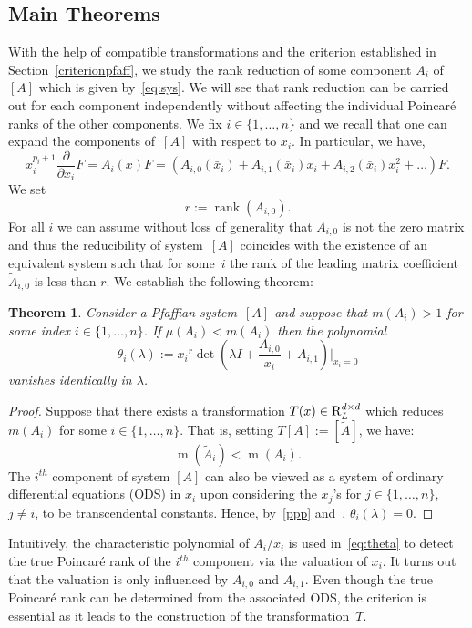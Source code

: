 \documentclass[final,1p,times,number,amsthm]{elsart}
\newtheorem{theorem}[lemma]{Theorem}
\newcommand{\pder}[2]{\frac{\partial}{\partial #2}#1}
\begin{document}
\subsection{Main Theorems}
\label{mainthmpfaff}
With the help of compatible transformations and the criterion established in
Section~\ref{criterionpfaff}, we study the rank reduction of some component
$A_i$ of~$[A]$ which is given by~\eqref{eq:sys}. We will see that rank reduction
can be carried out for each component independently without affecting the
individual Poincar\'e ranks of the other components. We fix
$i \in \{ 1, \dots, n\}$ and we recall that one can expand the components
of~$[A]$ with respect to $x_i$. In particular, we have,
\begin{equation*}
  x_i^{p_i +1 }\pder{F}{x_i} = A_i(x) F = (A_{i,0}({\bar{x}_i})+ A_{i,1}
({\bar{x}_i})x_i + A_{i,2}({\bar{x}_i}) x_i^2 + \dots ) F.
\end{equation*}
 We set
 \[r:= \operatorname{rank} (A_{i,0}).\]
 For all $i$ we can assume without loss of generality that $A_{i,0}$ is not the
 zero matrix and thus the reducibility of system~$[A]$ coincides with the
 existence of an equivalent system such that for some~$i$ the rank of the
 leading matrix coefficient
 $\tilde{A}_{i,0}$ is less than $r$. We establish the
 following theorem:
\begin{theorem}
\label{moserpfaff}
Consider a Pfaffian system~$[A]$ and suppose that $m(A_i) > 1$ for some index
$i \in \{1, \dots, n\}$. If $\mu(A_i) < m(A_i)$ then the polynomial
\begin{equation}
\label{eq:theta}
\theta_{i} (\lambda) := {x_i}^{r} \det(\lambda I + \frac{A_{i,0}}{x_i} + A_{i,1}
)|_{x_i=0}
\end{equation}
vanishes identically in $\lambda$.  
\end{theorem}

\begin{proof}
  Suppose that there exists a transformation $T(x) \in {\rm R}_L^{d \times d}$
  which reduces $m(A_i)$ for some $i \in \{ 1, \dots, n\}$. That is, setting
  $T[A] := [\tilde{A}]$, we have:
  \begin{equation} \label{ppp} \operatorname{m}(\tilde{A}_{i}) <
    \operatorname{m}(A_{i}) .\end{equation} The $i^{th}$ component of
  system $[A]$ can also be viewed as a system of ordinary differential equations
  (ODS) in $x_i$ upon considering the $x_j$'s for $j \in \{1, \dots, n\}$,
  $j \neq i$, to be transcendental constants. Hence, by~\eqref{ppp}
  and~\cite[Theorem 1]{key19}, $\theta_i(\lambda) = 0$.
\end{proof}
Intuitively, the characteristic polynomial of $A_i/x_i$ is used
in~\eqref{eq:theta} to detect the true Poincar\'e rank of the $i^{th}$ component
via the valuation of $x_i$. It turns out that the valuation is only influenced
by $A_{i,0}$ and $A_{i,1}$. Even though the true Poincar\'e rank can be
determined from the associated ODS, the criterion is essential as it leads to
the construction of the transformation~$T$.
\end{document}
